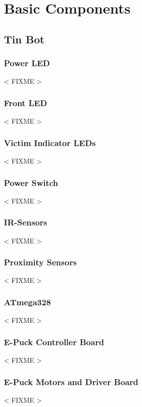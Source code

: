 \documentclass[a4paper,parskip,headheight=38pt]{scrartcl} %
\newcommand{\incomplete}[1]{\textless{} #1 \textgreater{}}
\begin{document}
\section{Basic Components}
\subsection{Tin Bot}

\subsubsection{Power LED}
\incomplete{FIXME}

\subsubsection{Front LED}
\incomplete{FIXME}

\subsubsection{Victim Indicator LEDs}
\incomplete{FIXME}

\subsubsection{Power Switch}
\incomplete{FIXME}

\subsubsection{IR-Sensors}
\incomplete{FIXME}

\subsubsection{Proximity Sensors}
\incomplete{FIXME}

\subsubsection{ATmega328}
\incomplete{FIXME}

\subsubsection{E-Puck Controller Board}
\incomplete{FIXME}

\subsubsection{E-Puck Motors and Driver Board}
\incomplete{FIXME}
\end{document}
